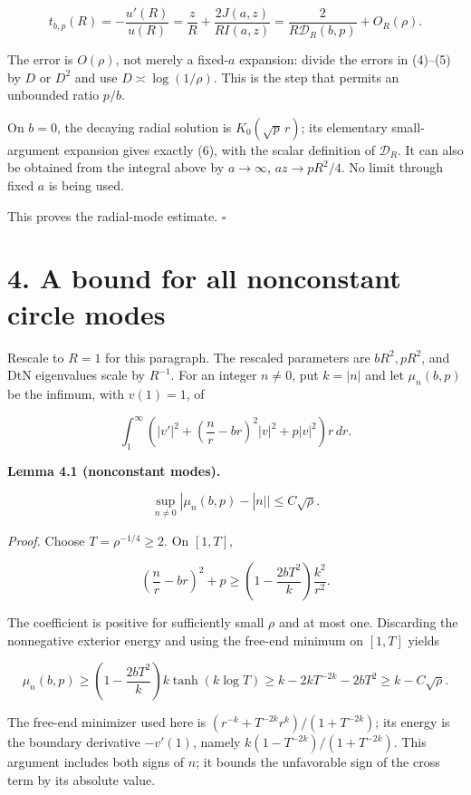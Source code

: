 \documentclass[11pt]{article}
\begin{document}
\[t_{b,p}(R)=-\frac{u'(R)}{u(R)}=\frac{z}{R}+\frac{2J(a,z)}{RI(a,z)}
=\frac{2}{R\mathcal D_R(b,p)}+O_R(\rho).\tag{6}\]

The error is \(O(\rho)\), not merely a fixed-\(a\) expansion: divide the
errors in (4)--(5) by \(D\) or \(D^2\) and use \(D\asymp\log(1/\rho)\).
This is the step that permits an unbounded ratio \(p/b\).

On \(b=0\), the decaying radial solution is \(K_0(\sqrt p\,r)\); its
elementary small-argument expansion gives exactly (6), with the scalar
definition of \(\mathcal D_R\). It can also be obtained from the
integral above by \(a\to\infty\), \(az\to pR^2/4\). No limit through
fixed \(a\) is being used.

This proves the radial-mode estimate. \(\square\)

\section{4. A bound for all nonconstant circle
modes}\label{a-bound-for-all-nonconstant-circle-modes}

Rescale to \(R=1\) for this paragraph. The rescaled parameters are
\(bR^2,pR^2\), and DtN eigenvalues scale by \(R^{-1}\). For an integer
\(n\ne0\), put \(k=|n|\) and let \(\mu_n(b,p)\) be the infimum, with
\(v(1)=1\), of

\[\int_1^\infty\left(|v'|^2+\left(\frac n r-br\right)^2|v|^2+p|v|^2\right)r\,dr.\]

\textbf{Lemma 4.1 (nonconstant modes).}

\[\sup_{n\ne0}|\mu_n(b,p)-|n||\leq C\sqrt\rho.\tag{7}\]

\emph{Proof.} Choose \(T=\rho^{-1/4}\geq2\). On \([1,T]\),

\[\left(\frac n r-br\right)^2+p\geq\left(1-\frac{2bT^2}{k}\right)\frac{k^2}{r^2}.\]

The coefficient is positive for sufficiently small \(\rho\) and at most
one. Discarding the nonnegative exterior energy and using the free-end
minimum on \([1,T]\) yields

\[\mu_n(b,p)\geq\left(1-\frac{2bT^2}{k}\right)k\tanh(k\log T)
\geq k-2kT^{-2k}-2bT^2\geq k-C\sqrt\rho.\]

The free-end minimizer used here is \((r^{-k}+T^{-2k}r^k)/(1+T^{-2k})\);
its energy is the boundary derivative \(-v'(1)\), namely
\(k(1-T^{-2k})/(1+T^{-2k})\). This argument includes both signs of
\(n\); it bounds the unfavorable sign of the cross term by its absolute
value.
\end{document}
